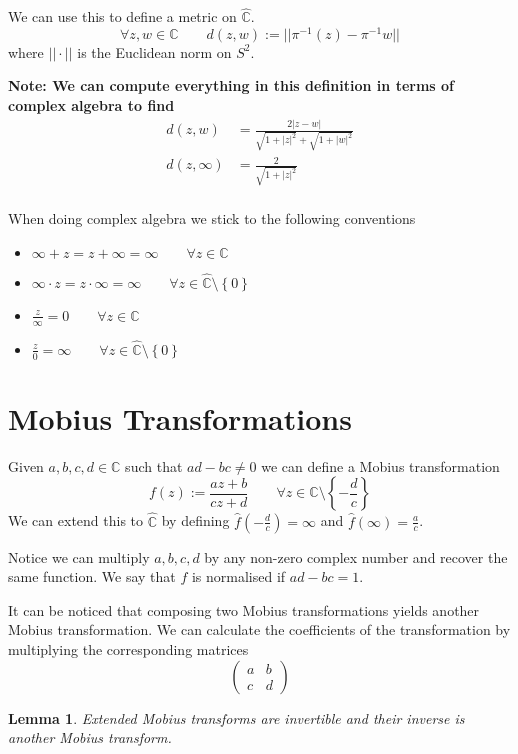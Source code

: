 \documentclass[11pt]{article}
\newcommand{\defeq}{:=}
\newcommand{\abs}[1]{|#1|}
\newcommand{\norm}[1]{||#1||}
\newcommand{\C}{\mathbb{C}}
\newcommand{\mdf}[1]{{\color{red} #1}}
\newenvironment{note}
	{\begin{mdframed}[backgroundcolor=white, linecolor=red, roundcorner=5pt, linewidth=1pt]\bfseries{Note:}\normalfont}
	{\end{mdframed}}
\newtheorem{lemma}[theorem]{Lemma}
\begin{document}
We can use this to define a metric on $\hat{\C}$.
\[
	\forall z, w\in \C \quad\quad d(z, w)\defeq\norm{\pi^{-1}(z) - \pi^{-1}w}
\]
where $\norm{\cdot}$ is the Euclidean norm on $S^2$.

\begin{note}
We can compute everything in this definition in terms of complex algebra to find
\begin{align*}
	d(z, w) &= \frac{2\abs{z-w}}{\sqrt{1+\abs{z}^2}+\sqrt{1+\abs{w}^2}}\\	
	d(z, \infty) &= \frac{2}{\sqrt{1+\abs{z}^2}}\\	
\end{align*}
\end{note}
When doing complex algebra we stick to the following conventions
\begin{itemize}
	\item $\infty + z = z + \infty = \infty \quad\quad\forall z\in\C$
	\item $\infty \cdot z = z \cdot \infty = \infty \quad\quad\forall z\in\hat{\C}\setminus\left\{0\right\}$
	\item $\frac{z}{\infty}=0 \quad\quad\forall z\in\C$
	\item $\frac{z}{0}=\infty \quad\quad\forall z\in\hat{\C}\setminus\left\{0\right\}$
\end{itemize}
\section{Mobius Transformations}

Given $a, b, c, d\in \C$ such that $ad-bc\neq 0$ we can define a \mdf{Mobius transformation}
\[
	f(z)\defeq\frac{az+b}{cz+d}\quad\quad\forall z\in\C\setminus\left\{-\frac{d}{c}\right\}
\]
We can extend this to $\hat{\C}$ by defining $\hat{f}(-\frac{d}{c})=\infty$ and $\hat{f}(\infty)=\frac{a}{c}$.

Notice we can multiply $a, b, c, d$ by any non-zero complex number and recover the same function.
We say that $f$ is \mdf{normalised} if $ad-bc=1$.

It can be noticed that composing two Mobius transformations yields another Mobius transformation.
We can calculate the coefficients of the transformation by multiplying the corresponding matrices
\[
\begin{pmatrix}
	a & b \\
	c & d
\end{pmatrix}
\]
\begin{lemma}
Extended Mobius transforms are invertible and their inverse is another Mobius transform.
\end{lemma}
\end{document}
